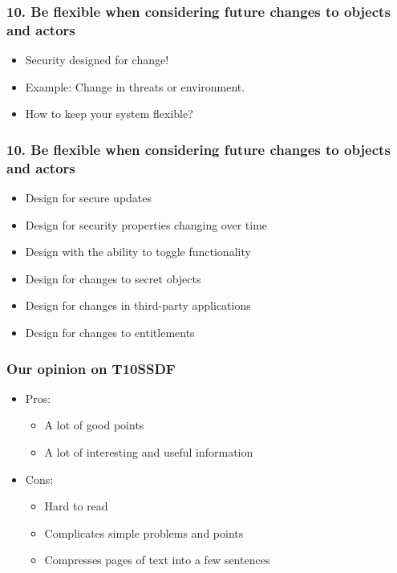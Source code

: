 \documentclass[12pt,norsk]{beamer}
\begin{document}
\begin{frame}

	\frametitle{10. Be flexible when considering future changes to objects and actors}
	\begin{itemize}
		\item Security designed for change!
		\item Example: Change in threats or environment.
		\item How to keep your system flexible?
	\end{itemize}
	
	

\end{frame}

\begin{frame}

	\frametitle{10. Be flexible when considering future changes to objects and actors}
	\begin{itemize}
		\item Design for secure updates
		\item Design for security properties changing over time
		\item Design with the ability to toggle functionality
		\item Design for changes to secret objects
		\item Design for changes in third-party applications
		\item Design for changes to entitlements
	\end{itemize}
	
	

\end{frame}

\begin{frame}

	\frametitle{Our opinion on T10SSDF}

	\begin{itemize}

		\item Pros:
		
		\begin{itemize}
			
			\item A lot of good points
			\item A lot of interesting and useful information		
		\end{itemize}				
				
		\item Cons:
		
		\begin{itemize}
			
			\item Hard to read
			\item Complicates simple problems and points
			\item Compresses pages of text into a few sentences
			
		\end{itemize}
	\end{itemize}

\end{frame}
\end{document}
